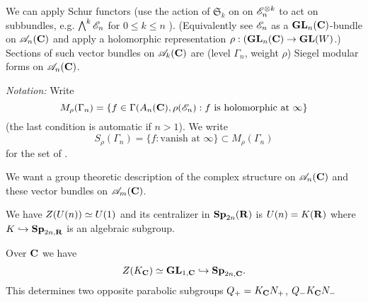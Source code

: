 We can apply Schur functors (use the action of $\mathfrak{S}_k$ on on $\mathscr{E}_n^{\otimes k}$ to act on subbundles, e.g. $\bigwedge^{k}\mathscr{E}_n$ for $0\le k\le n$ ). (Equivalently see $\mathscr{E}_n$ as a $\mathbf{GL}_n(\mathbf{C})$-bundle on $\mathscr{A}_n(\mathbf{C})$ and apply a holomorphic representation $\rho:(\GL_n(\bb{C})\to \GL(W)$.)
Sections of such vector bundles on $\mathscr{A}_k(\mathbf{C})$ are (level $\Gamma_n$, weight $\rho$) Siegel modular forms on $\mathscr{A}_n(\mathbf{C})$.

\emph{Notation:} Write
\[
	M_\rho(\Gamma_n) = \left\{ f\in \Gamma(A_n(\mathbf{C}),\rho(\mathscr{E}_n):f\text{ is holomorphic at }\infty \right\} 
\]
(the last condition is automatic if $n>1$). We write
\[
S_\rho(\Gamma_n) = \{f:\text{vanish at }\infty\} \subset M_\rho(\Gamma_n)
\]
for the set of .

We want a group theoretic description of the complex structure on $\mathscr{A}_n(\mathbf{C})$ and these vector bundles on $\mathscr{A}_m(\mathbf{C})$.

We have $Z(U(n))\simeq U(1)$ and its centralizer in $\mathbf{Sp}_{2n}(\mathbf{R})$ is $U(n)=K(\mathbf{R})$ where $K\hookrightarrow \mathbf{Sp}_{2n,\mathbf{R}}$ is an algebraic subgroup.

Over $\mathbf{C}$ we have
\[
	Z(K_{\mathbf{C}}) \simeq \mathbf{GL}_{1,\mathbf{C}} \hookrightarrow \mathbf{Sp}_{2n,\mathbf{C}}.
\] 
This determines two opposite parabolic subgroups $Q_+=K_{\mathbf{C}}N_+$, $Q_{-}K_{\mathbf{C}}N_-$



